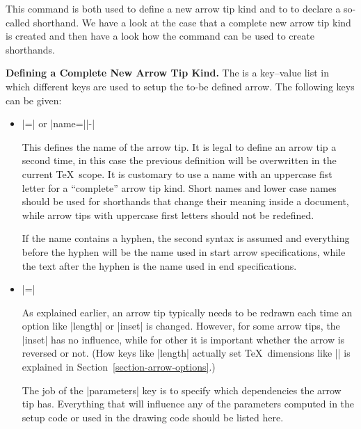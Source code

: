\begin{command}{\pgfdeclarearrow{}}
    This command is both used to define a new arrow tip kind and to to declare
    a so-called shorthand. We have a look at the case that a complete new arrow
    tip kind is created and then have a look how the command can be used to
    create shorthands.


    \medskip
    \noindent\textbf{Defining a Complete New Arrow Tip Kind.}
    The  is a key--value list in which different keys are used to
    setup the to-be defined arrow. The following keys can be given:
    \begin{itemize}
        \item {}|=| or |name=||-|

            This defines the name of the arrow tip. It is legal to define an
            arrow tip a second time, in this case the previous definition will
            be overwritten in the current \TeX\ scope. It is customary to use a
            name with an uppercase fist letter for a ``complete'' arrow tip
            kind. Short names and lower case names should be used for
            shorthands that change their meaning inside a document, while arrow
            tips with uppercase first letters should not be redefined.

            If the name contains a hyphen, the second syntax is assumed and
            everything before the hyphen will be the name used in start arrow
            specifications, while the text after the hyphen is the name used in
            end specifications.
        \item {}|=|

            As explained earlier, an arrow tip typically needs to be redrawn
            each time an option like |length| or |inset| is changed. However,
            for some arrow tips, the |inset| has no influence, while for other
            it is important whether the arrow is reversed or not. (How keys
            like |length| actually set \TeX\ dimensions like |\pgfarrowlength|
            is explained in Section~\ref{section-arrow-options}.)

            The job of the |parameters| key is to specify which dependencies
            the arrow tip has. Everything that will influence any of the
            parameters computed in the setup code or used in the drawing code
            should be listed here.


\end{itemize}
\end{command}
